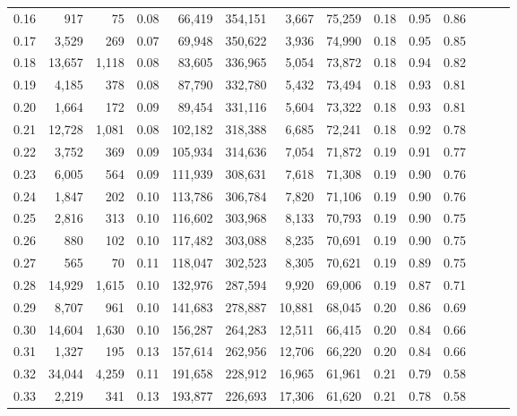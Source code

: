 \begin{tabular}{rrrrrrrrrrrrrr}
0.16 &     917 &     75 &  0.08 &   66,419 &  354,151 &   3,667 &  75,259 &  0.18 &  0.95 &      0.86 \\
0.17 &   3,529 &    269 &  0.07 &   69,948 &  350,622 &   3,936 &  74,990 &  0.18 &  0.95 &      0.85 \\
0.18 &  13,657 &  1,118 &  0.08 &   83,605 &  336,965 &   5,054 &  73,872 &  0.18 &  0.94 &      0.82 \\
0.19 &   4,185 &    378 &  0.08 &   87,790 &  332,780 &   5,432 &  73,494 &  0.18 &  0.93 &      0.81 \\
0.20 &   1,664 &    172 &  0.09 &   89,454 &  331,116 &   5,604 &  73,322 &  0.18 &  0.93 &      0.81 \\
0.21 &  12,728 &  1,081 &  0.08 &  102,182 &  318,388 &   6,685 &  72,241 &  0.18 &  0.92 &      0.78 \\
0.22 &   3,752 &    369 &  0.09 &  105,934 &  314,636 &   7,054 &  71,872 &  0.19 &  0.91 &      0.77 \\
0.23 &   6,005 &    564 &  0.09 &  111,939 &  308,631 &   7,618 &  71,308 &  0.19 &  0.90 &      0.76 \\
0.24 &   1,847 &    202 &  0.10 &  113,786 &  306,784 &   7,820 &  71,106 &  0.19 &  0.90 &      0.76 \\
0.25 &   2,816 &    313 &  0.10 &  116,602 &  303,968 &   8,133 &  70,793 &  0.19 &  0.90 &      0.75 \\
0.26 &     880 &    102 &  0.10 &  117,482 &  303,088 &   8,235 &  70,691 &  0.19 &  0.90 &      0.75 \\
0.27 &     565 &     70 &  0.11 &  118,047 &  302,523 &   8,305 &  70,621 &  0.19 &  0.89 &      0.75 \\
0.28 &  14,929 &  1,615 &  0.10 &  132,976 &  287,594 &   9,920 &  69,006 &  0.19 &  0.87 &      0.71 \\
0.29 &   8,707 &    961 &  0.10 &  141,683 &  278,887 &  10,881 &  68,045 &  0.20 &  0.86 &      0.69 \\
0.30 &  14,604 &  1,630 &  0.10 &  156,287 &  264,283 &  12,511 &  66,415 &  0.20 &  0.84 &      0.66 \\
0.31 &   1,327 &    195 &  0.13 &  157,614 &  262,956 &  12,706 &  66,220 &  0.20 &  0.84 &      0.66 \\
0.32 &  34,044 &  4,259 &  0.11 &  191,658 &  228,912 &  16,965 &  61,961 &  0.21 &  0.79 &      0.58 \\
0.33 &   2,219 &    341 &  0.13 &  193,877 &  226,693 &  17,306 &  61,620 &  0.21 &  0.78 &      0.58 \\

\end{tabular}
